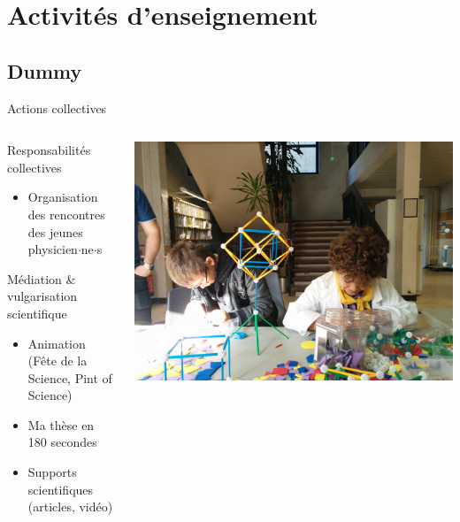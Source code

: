 \section{Activités d'enseignement}
\subsection{Dummy}
\begin{frame}{Actions collectives}
\begin{columns}
\begin{column}{0.6\textwidth}
\begin{block}{Responsabilités collectives}
\begin{itemize}
	\item Organisation des rencontres des jeunes physicien$\cdot$ne$\cdot$s
\end{itemize}
\end{block}
\begin{block}{Médiation \& vulgarisation scientifique}
\begin{itemize}
	\item Animation (Fête de la Science, Pint of Science)
	\item Ma thèse en 180 secondes
	\item Supports scientifiques (articles, vidéo)
\end{itemize}
\end{block}
\end{column}
\begin{column}{0.4\textwidth}
\centering
\includegraphics[width=\columnwidth]{img/3_projet_enseignement/fete_de_la_science}
\end{column}
\end{columns}
\end{frame}

